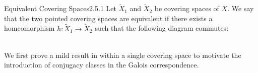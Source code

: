 \documentclass[a4paper]{article}
\begin{document}
\begin{defn}{Equivalent Covering Spaces}{2.5.1} Let $\tilde{X}_1$ and $\tilde{X}_2$ be covering spaces of $X$. We say that the two pointed covering spaces are equivalent if there exists a homeomorphism $h:\tilde{X}_1\to\tilde{X}_2$ such that the following diagram commutes: \\~\\
\end{defn}

We first prove a mild result in within a single covering space to motivate the introduction of conjugacy classes in the Galois correspondence. 
\end{document}
